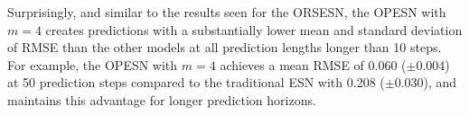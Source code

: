 Surprisingly, and similar to the results seen for the ORSESN, the OPESN with $m=4$ creates predictions with a substantially lower mean and standard deviation of RMSE than the other models at all prediction lengths longer than 10 steps. For example, the OPESN with $m=4$ achieves a mean RMSE of 0.060 ($\pm 0.004$) at 50 prediction steps compared to the traditional ESN with 0.208 ($\pm 0.030$), and maintains this advantage for longer prediction horizons.


\begin{figure}
    \centering





\end{figure}
